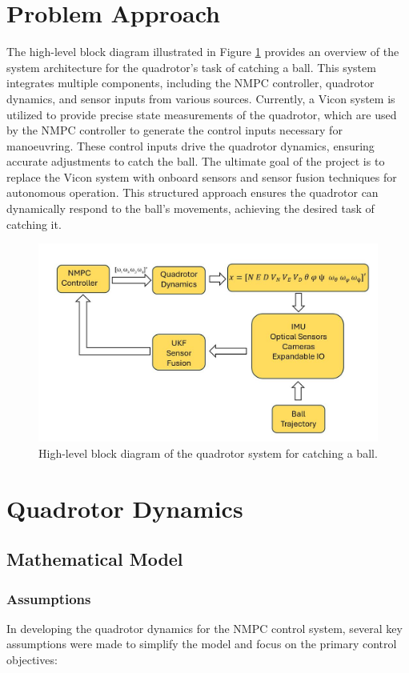 \documentclass{UoNMCHA}
\numberwithin{equation}{section}
\begin{document}
\section{Problem Approach}
The high-level block diagram illustrated in Figure \ref{fig:HighLevelBlockDiagram} provides an overview of the system architecture for the quadrotor's task of catching a ball. This system integrates multiple components, including the NMPC controller, quadrotor dynamics, and sensor inputs from various sources. Currently, a Vicon system is utilized to provide precise state measurements of the quadrotor, which are used by the NMPC controller to generate the control inputs necessary for manoeuvring. These control inputs drive the quadrotor dynamics, ensuring accurate adjustments to catch the ball. The ultimate goal of the project is to replace the Vicon system with onboard sensors and sensor fusion techniques for autonomous operation. This structured approach ensures the quadrotor can dynamically respond to the ball's movements, achieving the desired task of catching it.
\begin{figure}[h!]
    \centering
    \includegraphics[width=\linewidth]{Figures/High Level Block Diagram.JPG}
    \caption{High-level block diagram of the quadrotor system for catching a ball.}
    \label{fig:HighLevelBlockDiagram} %
\end{figure}
\section{Quadrotor Dynamics}
\subsection{Mathematical Model}
\subsubsection{Assumptions}
In developing the quadrotor dynamics for the NMPC control system, several key assumptions were made to simplify the model and focus on the primary control objectives:
\end{document}
